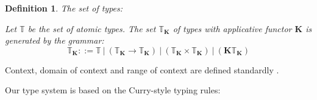 \documentclass[a4paper]{article}
\newtheorem{defin}{Definition}
\begin{document}
  \begin{defin} The set of types:

  Let $\mathbb{T}$ be the set of atomic types. The set $\mathbb{T}_{\textbf{K}}$ of types with applicative
  functor
  $\textbf{K}$ is generated by the grammar:
  \begin{equation}
    \mathbb{T}_{\textbf{K}} ::= \mathbb{T} \: | \: (\mathbb{T}_{\textbf{K}} \to \mathbb{T}_{\textbf{K}}) \: |
    \:
    (\mathbb{T}_{\textbf{K}} \times \mathbb{T}_{\textbf{K}}) \: | \: (\textbf{K}\mathbb{T}_{\textbf{K}})
  \end{equation}
  \end{defin}

  Context, domain of context and range of context are defined standardly \cite{Neder}\cite{Morten}.

  Our type system is based on the Curry-style typing rules:
\end{document}
